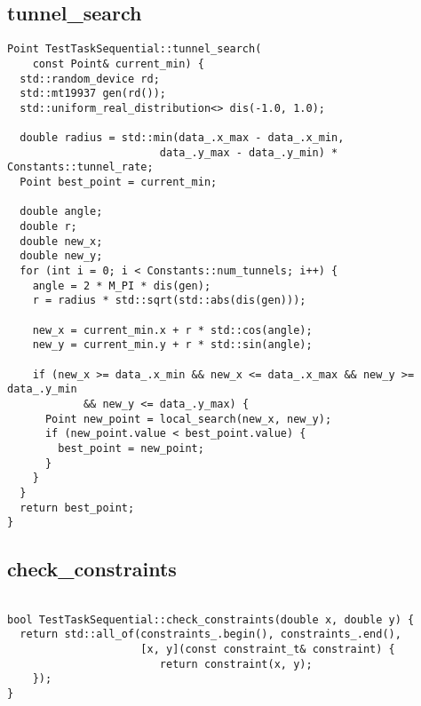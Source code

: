 \documentclass[12pt]{article}
\begin{document}
\subsection{tunnel\_search}
\begin{verbatim}
Point TestTaskSequential::tunnel_search(
    const Point& current_min) {
  std::random_device rd;
  std::mt19937 gen(rd());
  std::uniform_real_distribution<> dis(-1.0, 1.0);

  double radius = std::min(data_.x_max - data_.x_min, 
                        data_.y_max - data_.y_min) * Constants::tunnel_rate;
  Point best_point = current_min;

  double angle;
  double r;
  double new_x;
  double new_y;
  for (int i = 0; i < Constants::num_tunnels; i++) {
    angle = 2 * M_PI * dis(gen);
    r = radius * std::sqrt(std::abs(dis(gen)));

    new_x = current_min.x + r * std::cos(angle);
    new_y = current_min.y + r * std::sin(angle);

    if (new_x >= data_.x_min && new_x <= data_.x_max && new_y >= data_.y_min 
            && new_y <= data_.y_max) {
      Point new_point = local_search(new_x, new_y);
      if (new_point.value < best_point.value) {
        best_point = new_point;
      }
    }
  }
  return best_point;
}
\end{verbatim}
\newpage

\subsection{check\_constraints}
\begin{verbatim}

bool TestTaskSequential::check_constraints(double x, double y) {
  return std::all_of(constraints_.begin(), constraints_.end(),
                     [x, y](const constraint_t& constraint) { 
                        return constraint(x, y); 
    });
}
\end{verbatim}
\end{document}
